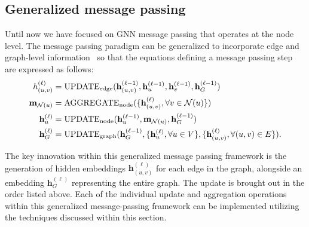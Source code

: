\subsection{Generalized message passing}
Until now we have focused on GNN message passing that operates at the node level. The message passing paradigm can be generalized to incorporate edge and graph-level information~\cite{battaglia2018relationalInductiveBiases} so that the equations defining a message passing step are expressed as follows:
\begin{align*}
\label\mathbf{h}^{(\ell)}_{(u,v)} &= \text{UPDATE}_\text{edge}(\mathbf{h}^{(\ell-1)}_{(u,v)}, \mathbf{h}^{(\ell-1)}_u, \mathbf{h}^{(\ell-1)}_v, \mathbf{h}^{(\ell-1)}_G)\\
\mathbf{m}_{\mathcal{N}(u)} &= \text{AGGREGATE}_\text{node}(\{\mathbf{h}^{(\ell)}_{(u,v)}, \forall v \in \mathcal{N}(u)\})\\
\mathbf{h}^{(\ell)}_u &= \text{UPDATE}_\text{node}(\mathbf{h}^{(\ell-1)}_u, \mathbf{m}_{\mathcal{N}(u)}, \mathbf{h}^{(\ell-1)}_G)\\
\mathbf{h}^{(\ell)}_G &= \text{UPDATE}_\text{graph}(\mathbf{h}^{(\ell-1)}_G, \{\mathbf{h}^{(\ell)}_u, \forall u \in V\}, \{\mathbf{h}^{(\ell)}_{(u,v)}, \forall (u,v) \in E\}).
\end{align*}

The key innovation within this generalized message passing framework is the generation of hidden embeddings $ \mathbf{h}^{(\ell)}_{(u,v)} $ for each edge in the graph, alongside an embedding $ \mathbf{h}^{(\ell)}_G $ representing the entire graph. 
The update is brought out in the order listed above. Each of the individual update and aggregation operations within this generalized message-passing framework can be implemented utilizing the techniques discussed within this section.